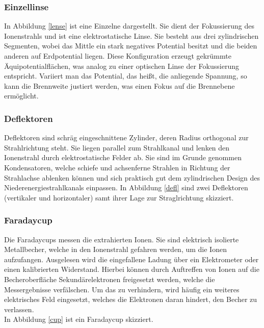        \subsubsection{Einzellinse}
           In Abbildung \ref{lense} ist eine Einzelne dargestellt. Sie dient der Fokussierung des Ionenstrahls und ist eine elektrostatische Linse. Sie besteht aus drei zylindrischen Segmenten, wobei das Mittle ein stark negatives Potential besitzt und die beiden anderen auf Erdpotential liegen. Diese Konfiguration erzeugt gekrümmte Äquipotentialflächen, was analog zu einer optischen Linse der Fokussierung entspricht. 
           Variiert man das Potential, das heißt, die anliegende Spannung, so kann die Brennweite justiert werden, was einen Fokus auf die Brennebene ermöglicht.
        \subsubsection{Deflektoren}
            Deflektoren sind schräg eingeschnittene Zylinder, deren Radius orthogonal zur Strahlrichtung steht. Sie liegen parallel zum Strahlkanal und lenken den Ionenstrahl durch elektrostatische Felder ab. Sie sind im Grunde genommen Kondensatoren, welche schiefe und achsenferne Strahlen in Richtung der Strahlachse ablenken können und sich praktisch gut dem zylindrischen Design des Niederenergiestrahlkanals einpassen. In Abbildung \ref{defl} sind zwei Deflektoren (vertikaler und horizontaler) samt ihrer Lage zur Straglrichtung skizziert.
        \subsubsection{Faradaycup}
            Die Faradaycups messen die extrahierten Ionen. Sie sind elektrisch isolierte Metallbecher, welche in den Ionenstrahl gefahren werden, um die Ionen aufzufangen. Ausgelesen wird die eingefallene Ladung über ein Elektrometer oder einen kalibrierten Widerstand. Hierbei können durch Auftreffen von Ionen auf die Becheroberfläche Sekundärelektronen freigesetzt werden, welche die Messergebnisse verfälschen. Um das zu verhindern, wird häufig ein weiteres elektrisches Feld eingesetzt, welches die Elektronen daran hindert, den Becher zu verlassen.  \\
            In Abbildung \ref{cup} ist ein Faradaycup skizziert. 
           
